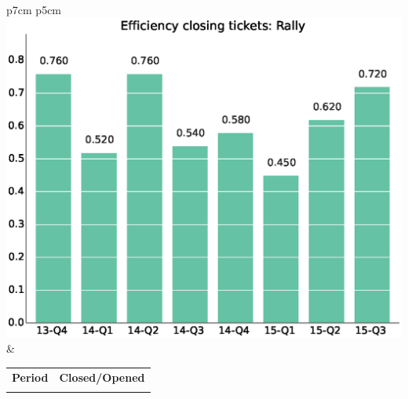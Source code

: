 \documentclass[a4wide,11pt]{article}
\begin{document}


\begin{tabular}{p{7cm} p{5cm}}
    \vspace{0pt} 
    \includegraphics[scale=.35]{figs/bmiRally.eps}
    & 
    \vspace{0pt}
    \begin{tabular}{l|l}%
    \bfseries Period & \bfseries Closed/Opened %
    \csvreader[head to column names]{data/bmiRally.csv}{}%
    {\\ & \bmi}
    \end{tabular}
\end{tabular}
\end{document}
